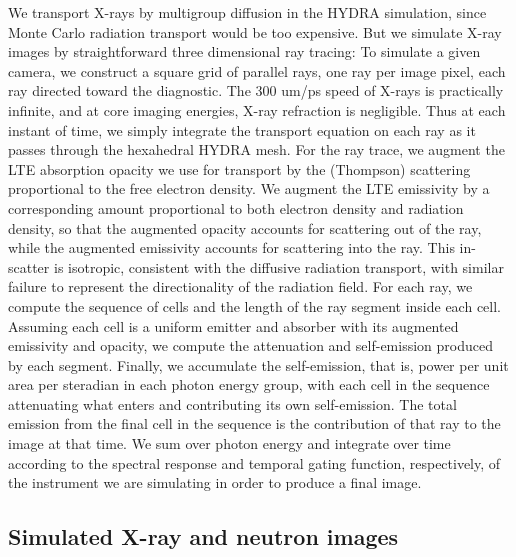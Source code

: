 \documentclass[aip,pop,numerical,reprint,floatfix]{revtex4-1}
\begin{document}
We transport X-rays by multigroup diffusion in the HYDRA simulation,
since Monte Carlo radiation transport would be too expensive. But
we simulate X-ray images by straightforward three dimensional ray
tracing: To simulate a given camera, we construct a square grid of
parallel rays, one ray per image pixel, each ray directed toward the
diagnostic. The 300 um/ps speed of X-rays is practically infinite,
and at core imaging energies, X-ray refraction is negligible. Thus
at each instant of time, we simply integrate the transport equation
on each ray as it passes through the hexahedral HYDRA mesh. For the
ray trace, we augment the LTE absorption opacity we use for transport
by the (Thompson) scattering proportional to the free electron density.
We augment the LTE emissivity by a corresponding amount proportional
to both electron density and radiation density, so that the augmented
opacity accounts for scattering out of the ray, while the augmented
emissivity accounts for scattering into the ray. This in-scatter is
isotropic, consistent with the diffusive radiation transport, with
similar failure to represent the directionality of the radiation field.
For each ray, we compute the sequence of cells and the length of the
ray segment inside each cell. Assuming each cell is a uniform emitter
and absorber with its augmented emissivity and opacity, we compute
the attenuation and self-emission produced by each segment. Finally,
we accumulate the self-emission, that is, power per unit area per
steradian in each photon energy group, with each cell in the sequence
attenuating what enters and contributing its own self-emission. The
total emission from the final cell in the sequence is the contribution
of that ray to the image at that time. We sum over photon energy and
integrate over time according to the spectral response and temporal
gating function, respectively, of the instrument we are simulating
in order to produce a final image.

\subsection{\label{sec:sim_xray_neut}Simulated X-ray and neutron images}
\end{document}
